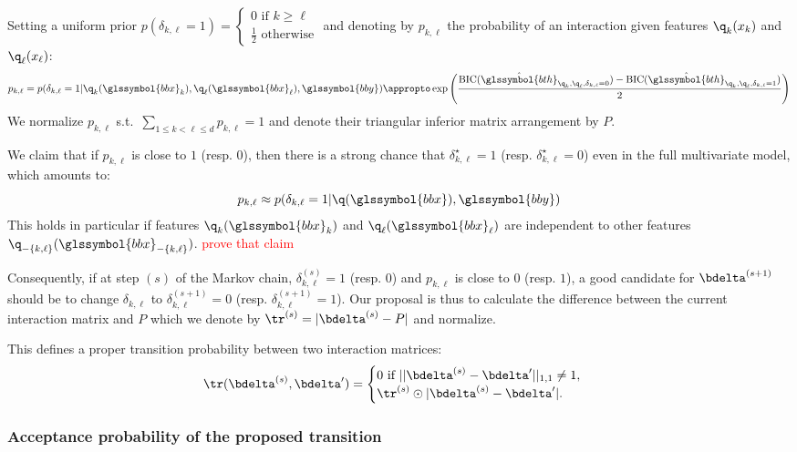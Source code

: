 Setting a uniform prior $p(\delta_{k,\ell}=1) =\begin{cases} 0 \text{ if } k \geq \ell \\ \frac{1}{2} \text{ otherwise} \end{cases}$ and denoting by $p_{k,\ell}$ the probability of an interaction given features $\q_k(x_k)$ and $\q_\ell(x_\ell)$:
\[ p_{k,\ell} = p(\delta_{k,\ell} = 1 | \q_k(\glssymbol{bbx}_k), \q_\ell(\glssymbol{bbx}_\ell), \glssymbol{bby}) \appropto \exp \left( \frac{\text{BIC}(\hat{\glssymbol{bth}}_{\q_k,\q_\ell,\delta_{k,\ell}=0}) - \text{BIC}(\hat{\glssymbol{bth}}_{\q_k,\q_\ell,\delta_{k,\ell}=1})}{2} \right) \]
We normalize $p_{k,\ell}$ s.t.\ $\sum_{1 \leq k < \ell \leq d} p_{k,\ell} = 1$ and denote their triangular inferior matrix arrangement by $P$.

We claim that if $p_{k,\ell}$ is close to $1$ (resp. $0$), then there is a strong chance that $\delta_{k,\ell}^\star = 1$ (resp. $\delta_{k,\ell}^\star = 0$) even in the full multivariate model, which amounts to:
\[ p_{k,\ell} \approx p(\delta_{k,\ell} = 1 | \q(\glssymbol{bbx}),\glssymbol{bby}) \]
This holds in particular if features $\q_k(\glssymbol{bbx}_k)$ and $\q_\ell(\glssymbol{bbx}_\ell)$ are independent to other features $\q_{-\{k,\ell\}}(\glssymbol{bbx}_{-\{k,\ell\}})$.  \textcolor{red}{prove that claim}

Consequently, if at step $(s)$ of the Markov chain, $\delta_{k,\ell}^{(s)} = 1$ (resp. $0$) and $p_{k,\ell}$ is close to $0$ (resp. $1$), a good candidate for $\bdelta^{(s+1)}$ should be to change $\delta_{k,\ell}$ to $\delta_{k,\ell}^{(s+1)} = 0$ (resp. $\delta_{k,\ell}^{(s+1)} = 1$). Our proposal is thus to calculate the difference between the current interaction matrix and $P$ which we denote by $\tr^{(s)} = |\bdelta^{(s)} - P|$ and normalize.

This defines a proper transition probability between two interaction matrices:
\[ \tr(\bdelta^{(s)},\bdelta') = \begin{cases} 0 \text{ if } ||\bdelta^{(s)} - \bdelta'||_{1,1} \neq 1, \\ \tr^{(s)} \odot |\bdelta^{(s)} - \bdelta'|. \end{cases} \]

\subsubsection{Acceptance probability of the proposed transition}


